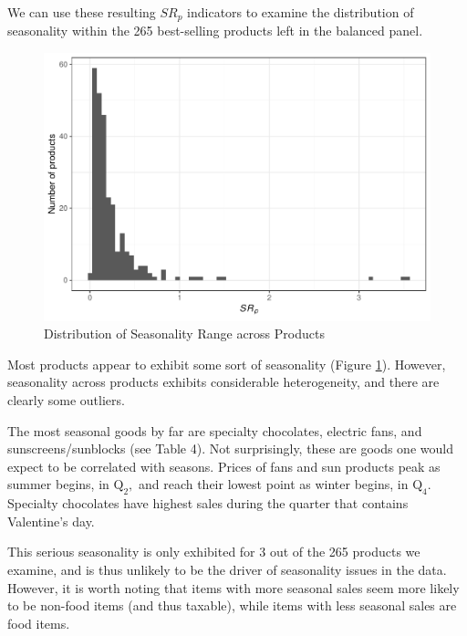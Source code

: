 \documentclass[]{article}
\begin{document}
We can use these resulting \(SR_p\) indicators to examine the
distribution of seasonality within the 265 best-selling products left in
the balanced panel.

\begin{figure}
\centering
\includegraphics{exploring_heterogeneity_v2_files/figure-latex/plot_seasonality-1.pdf}
\caption{\label{fig:fig3}Distribution of Seasonality Range across
Products}
\end{figure}

Most products appear to exhibit some sort of seasonality (Figure
\ref{fig:fig3}). However, seasonality across products exhibits
considerable heterogeneity, and there are clearly some outliers.

The most seasonal goods by far are specialty chocolates, electric fans,
and sunscreens/sunblocks (see Table 4). Not surprisingly, these are
goods one would expect to be correlated with seasons. Prices of fans and
sun products peak as summer begins, in \(\text{Q}_2,\) and reach their
lowest point as winter begins, in \(\text{Q}_4.\) Specialty chocolates
have highest sales during the quarter that contains Valentine's day.

This serious seasonality is only exhibited for 3 out of the 265 products
we examine, and is thus unlikely to be the driver of seasonality issues
in the data. However, it is worth noting that items with more seasonal
sales seem more likely to be non-food items (and thus taxable), while
items with less seasonal sales are food items.
\end{document}
